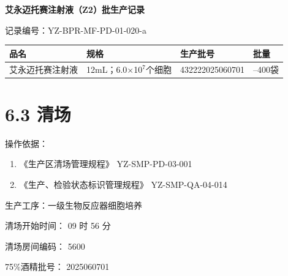 \documentclass[UTF8,10pt,a4paper,fontset=fandol]{ctexart}
\newcommand{\fieldvalue}[1]{#1}
\newcommand{\handwritten}[1]{#1}
\begin{document}
\newpage

\begin{center}
\textbf{\large 艾永迈托赛注射液（Z2）批生产记录}
\end{center}

\noindent
记录编号：YZ-BPR-MF-PD-01-020-a

\begin{tabularx}{\textwidth}{|>{\centering\arraybackslash}X|>{\centering\arraybackslash}X|>{\centering\arraybackslash}X|>{\centering\arraybackslash}X|}
\hline
品名 & 规格 & 生产批号 & 批量\\
\hline
艾永迈托赛注射液 & 12mL；6.0$\times$10$^7$个细胞 &
\fieldvalue{\handwritten{432222025060701}} &
200--400袋\\
\hline
\end{tabularx}

\vspace{0.5em}

\section*{6.3 清场}

\noindent
操作依据：

\begin{enumerate}
    \item 《生产区清场管理规程》 \hfill YZ-SMP-PD-03-001
    \item 《生产、检验状态标识管理规程》 \hfill YZ-SMP-QA-04-014
\end{enumerate}

\noindent
生产工序：一级生物反应器细胞培养

\noindent
清场开始时间：
\fieldvalue{\handwritten{09}} 时
\fieldvalue{\handwritten{56}} 分

\noindent
清场房间编码：
\fieldvalue{\handwritten{5600}}

\hfill
75\%酒精批号：
\fieldvalue{\handwritten{2025060701}}

\vspace{0.5em}
\end{document}
